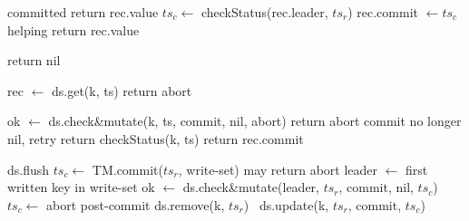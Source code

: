\begin{algorithm}[t]
  \begin{algorithmic}
    \small
		 \Comment committed
     			   \State return rec.value \EndIf
 			\State $ts_c \leftarrow$ {\sc checkStatus}(rec.leader, $ts_r$)
   			\State rec.commit $\leftarrow ts_c$ \Comment helping 
 			   \State return  rec.value \EndIf
      		\EndIf
      		


      \EndFor
      \State  return nil
      \EndProcedure

\Statex


      				\State rec $\leftarrow$ ds.get(k, ts) 
     				 	 return abort  
     				 \EndIf 		
     				 
     				    
     				 	\State ok $\leftarrow$ ds.check\&mutate(k, ts, commit, nil, abort)
						\State return abort	
					\Else \Comment commit  no longer nil, retry
						\State return {\sc checkStatus}(k, ts)
	     				 \EndIf 			
				\EndIf
				\State return rec.commit  %
	   	\EndProcedure
\Statex

      	\State ds.flush
      	\State $ts_c \leftarrow$ TM.commit($ts_r$, write-set) \Comment may return abort
		\State leader  $\leftarrow$ first written key in write-set %
	      	 \State  ok $\leftarrow$ ds.check\&mutate(leader, $ts_r$, commit, nil,  $ts_c$)
   		 $ts_c \leftarrow$ abort \EndIf
	\EndIf
	\State \Comment post-commit
			 ds.remove(k, $ts_r$)  	
			\Else\ ds.update(k, $ts_r$, commit, $ts_c$)
			\EndIf
	\EndFor
\EndProcedure
      

\end{algorithmic}
\end{algorithm}

